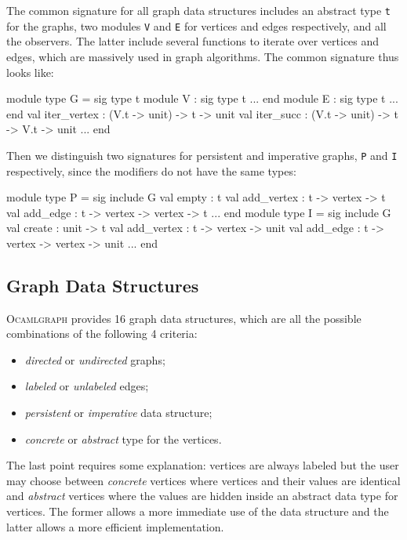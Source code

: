 \documentclass[tfpsymp]{tfp05symp}
\newcommand{\ocamlgraph}{\textsc{Ocamlgraph}\xspace}
\begin{document}
The common signature for all graph data structures includes an
abstract type \texttt{t} for the graphs, two modules \texttt{V} and
\texttt{E} for vertices and edges respectively, and all the
observers. The latter include several functions to iterate over
vertices and edges, which are massively used in graph algorithms. 
The common signature thus looks like:
\begin{ocaml}
module type G = sig
  type t
  module V : sig type t ... end
  module E : sig type t ... end
  val iter_vertex : (V.t -> unit) -> t -> unit
  val iter_succ : (V.t -> unit) -> t -> V.t -> unit
  ...
end
\end{ocaml}
Then we distinguish two signatures for persistent and imperative
graphs, \texttt{P} and \texttt{I} respectively, since the modifiers do
not have the same types:
\begin{ocaml}
module type P = sig
  include G
  val empty : t
  val add_vertex : t -> vertex -> t
  val add_edge : t -> vertex -> vertex -> t
  ...
end
module type I = sig
  include G
  val create : unit -> t
  val add_vertex : t -> vertex -> unit
  val add_edge : t -> vertex -> vertex -> unit
  ...
end
\end{ocaml}

\subsection{Graph Data Structures}\label{structuresdedonnees}

\ocamlgraph provides 16 graph data structures, which are all the
possible combinations of the following 4 criteria:
\begin{itemize}
\item \emph{directed} or \emph{undirected} graphs;
\item \emph{labeled} or \emph{unlabeled} edges;
\item \emph{persistent} or \emph{imperative} data structure;
\item \emph{concrete} or \emph{abstract} type for the vertices.
\end{itemize}
The last point requires some explanation: vertices are always labeled
but the user may choose between \emph{concrete} vertices where vertices and
their values are identical and \emph{abstract} vertices where the
values are hidden inside an abstract data type for vertices. The
former allows a more immediate use of the data structure and the
latter allows a more efficient implementation.
\end{document}
